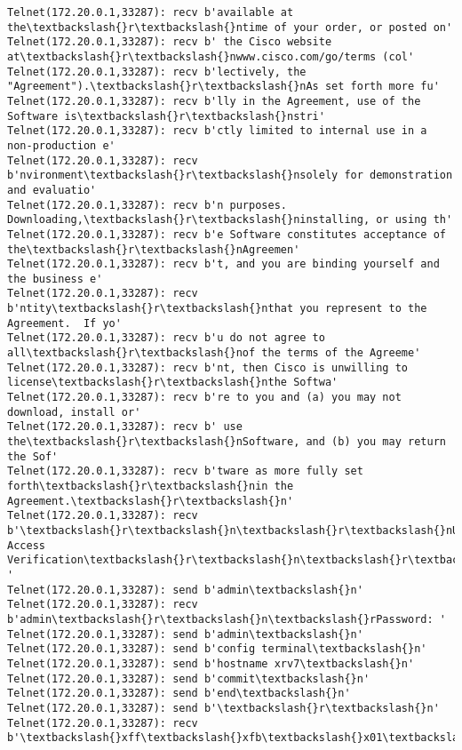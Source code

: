 \documentclass[11pt]{article}
\begin{document}
\begin{Verbatim}[commandchars=\\\{\}]
Telnet(172.20.0.1,33287): recv b'available at the\textbackslash{}r\textbackslash{}ntime of your order, or posted on'
Telnet(172.20.0.1,33287): recv b' the Cisco website at\textbackslash{}r\textbackslash{}nwww.cisco.com/go/terms (col'
Telnet(172.20.0.1,33287): recv b'lectively, the "Agreement").\textbackslash{}r\textbackslash{}nAs set forth more fu'
Telnet(172.20.0.1,33287): recv b'lly in the Agreement, use of the Software is\textbackslash{}r\textbackslash{}nstri'
Telnet(172.20.0.1,33287): recv b'ctly limited to internal use in a non-production e'
Telnet(172.20.0.1,33287): recv b'nvironment\textbackslash{}r\textbackslash{}nsolely for demonstration and evaluatio'
Telnet(172.20.0.1,33287): recv b'n purposes.  Downloading,\textbackslash{}r\textbackslash{}ninstalling, or using th'
Telnet(172.20.0.1,33287): recv b'e Software constitutes acceptance of the\textbackslash{}r\textbackslash{}nAgreemen'
Telnet(172.20.0.1,33287): recv b't, and you are binding yourself and the business e'
Telnet(172.20.0.1,33287): recv b'ntity\textbackslash{}r\textbackslash{}nthat you represent to the Agreement.  If yo'
Telnet(172.20.0.1,33287): recv b'u do not agree to all\textbackslash{}r\textbackslash{}nof the terms of the Agreeme'
Telnet(172.20.0.1,33287): recv b'nt, then Cisco is unwilling to license\textbackslash{}r\textbackslash{}nthe Softwa'
Telnet(172.20.0.1,33287): recv b're to you and (a) you may not download, install or'
Telnet(172.20.0.1,33287): recv b' use the\textbackslash{}r\textbackslash{}nSoftware, and (b) you may return the Sof'
Telnet(172.20.0.1,33287): recv b'tware as more fully set forth\textbackslash{}r\textbackslash{}nin the Agreement.\textbackslash{}r\textbackslash{}n'
Telnet(172.20.0.1,33287): recv b'\textbackslash{}r\textbackslash{}n\textbackslash{}r\textbackslash{}nUser Access Verification\textbackslash{}r\textbackslash{}n\textbackslash{}r\textbackslash{}nUsername: '
Telnet(172.20.0.1,33287): send b'admin\textbackslash{}n'
Telnet(172.20.0.1,33287): recv b'admin\textbackslash{}r\textbackslash{}n\textbackslash{}rPassword: '
Telnet(172.20.0.1,33287): send b'admin\textbackslash{}n'
Telnet(172.20.0.1,33287): send b'config terminal\textbackslash{}n'
Telnet(172.20.0.1,33287): send b'hostname xrv7\textbackslash{}n'
Telnet(172.20.0.1,33287): send b'commit\textbackslash{}n'
Telnet(172.20.0.1,33287): send b'end\textbackslash{}n'
Telnet(172.20.0.1,33287): send b'\textbackslash{}r\textbackslash{}n'
Telnet(172.20.0.1,33287): recv b'\textbackslash{}xff\textbackslash{}xfb\textbackslash{}x01\textbackslash{}xff\textbackslash{}xfb\textbackslash{}x03\textbackslash{}xff\textbackslash{}xfb\textbackslash{}x00\textbackslash{}xff\textbackslash{}xfd\textbackslash{}x00\textbackslash{}x1b]0;xrv7\textbackslash{}x07\textbackslash{}r\textbackslash{}n\textbackslash{}rRP/0/0/CPU0:xrv7\#\textbackslash{}r\textbackslash{}n\textbackslash{}rRP/0/0'

\end{Verbatim}
\end{document}
